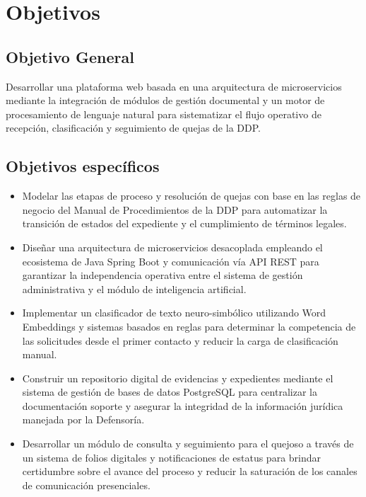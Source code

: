 \section{Objetivos}

    \subsection{Objetivo General}

        Desarrollar una plataforma web basada en una arquitectura de microservicios mediante la integración de módulos de gestión documental y un motor de procesamiento de lenguaje natural para sistematizar el flujo operativo de recepción, clasificación y seguimiento de quejas de la DDP.
    
    \subsection{Objetivos específicos}
        \begin{itemize}
            \item Modelar las etapas de proceso y resolución de quejas con base en las reglas de negocio del Manual de Procedimientos de la DDP para automatizar la transición de estados del expediente y el cumplimiento de términos legales.
            \item Diseñar una arquitectura de microservicios desacoplada empleando el ecosistema de Java Spring Boot y comunicación vía API REST para garantizar la independencia operativa entre el sistema de gestión administrativa y el módulo de inteligencia artificial.
            \item Implementar un clasificador de texto neuro-simbólico utilizando Word Embeddings y sistemas basados en reglas para determinar la competencia de las solicitudes desde el primer contacto y reducir la carga de clasificación manual.
            \item Construir un repositorio digital de evidencias y expedientes mediante el sistema de gestión de bases de datos PostgreSQL para centralizar la documentación soporte y asegurar la integridad de la información jurídica manejada por la Defensoría.
            \item Desarrollar un módulo de consulta y seguimiento para el quejoso a través de un sistema de folios digitales y notificaciones de estatus para brindar certidumbre sobre el avance del proceso y reducir la saturación de los canales de comunicación presenciales.
        \end{itemize}

